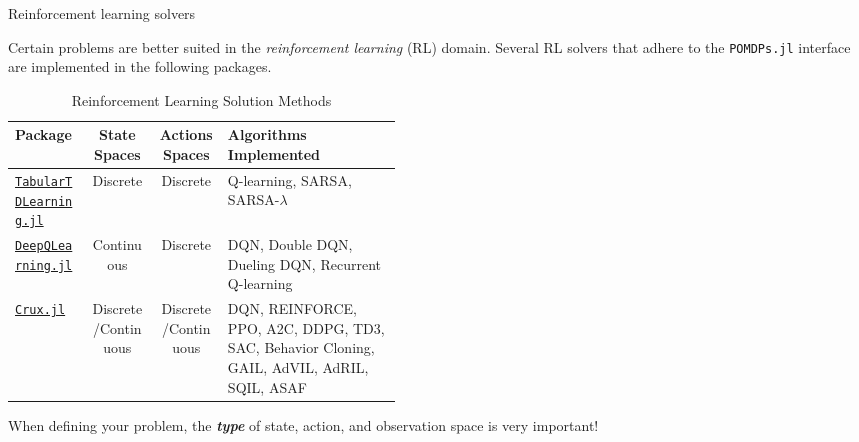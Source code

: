 \begin{frame}{Reinforcement learning solvers}

{\small Certain problems are better suited in the \textit{reinforcement learning} (RL) domain. Several RL solvers that adhere to the \texttt{POMDPs.jl} interface are implemented in the following packages.}

\begin{table}[!t]
    {\tiny
    \centering
    \caption{\label{tab:solutions} Reinforcement Learning Solution Methods}
    \begin{threeparttable}
    \begin{tabular}{lccp{0.45\linewidth}}
        \toprule
        \textbf{Package} & \textbf{State Spaces} & \textbf{Actions Spaces} & \textbf{Algorithms Implemented} \\
        \midrule
        \href{https://github.com/JuliaPOMDP/TabularTDLearning.jl}{\texttt{TabularTDLearning.jl}} & Discrete & Discrete & Q-learning, SARSA, SARSA-$\lambda$ \\
        \href{https://github.com/JuliaPOMDP/DeepQLearning.jl}{\texttt{DeepQLearning.jl}} & Continuous & Discrete & DQN, Double DQN, Dueling DQN, Recurrent Q-learning\\
        \href{https://github.com/ancorso/Crux.jl}{\texttt{Crux.jl}} & Discrete/Continuous & Discrete/Continuous & DQN, REINFORCE, PPO, A2C, DDPG, TD3, SAC, Behavior Cloning, GAIL, AdVIL, AdRIL, SQIL, ASAF\\
        \bottomrule
    \end{tabular}
    \end{threeparttable}
    }
\end{table}

{\tiny
\begin{importantblock}
When defining your problem, the \textbf{\textit{type}} of state, action, and observation space is very important!
\end{importantblock}
}

\end{frame}


